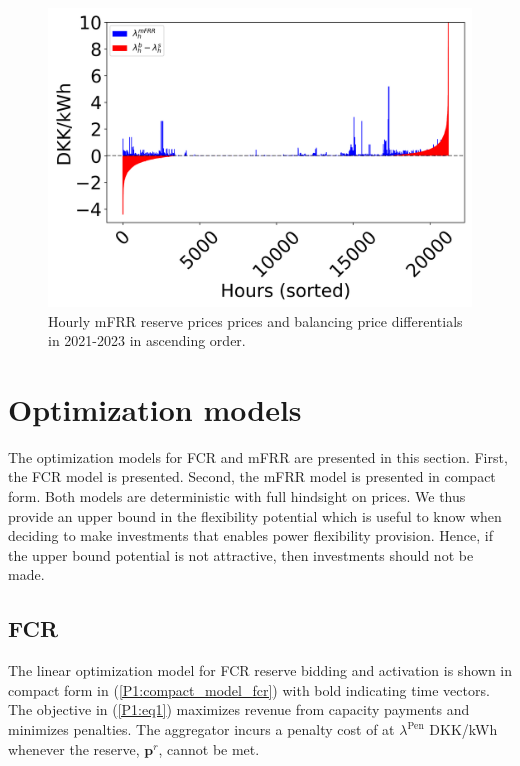 \documentclass[lettersize,journal]{IEEEtran}
\begin{document}
\begin{figure}[t]
    \centering
    \includegraphics[width=\columnwidth]{figures/mfrr_prices.png}
    \caption{Hourly mFRR reserve prices prices and balancing price differentials in 2021-2023 in ascending order.}
    \label{fig:mfrr_prices_2022}
\end{figure}

\section{Optimization models}

The optimization models for FCR and mFRR are presented in this section. First, the FCR model is presented. Second, the mFRR model is presented in compact form. Both models are deterministic with full hindsight on prices. We thus provide an upper bound in the flexibility potential which is useful to know when deciding to make investments that enables power flexibility provision. Hence, if the upper bound potential is not attractive, then investments should not be made.

\subsection{FCR}

The linear optimization model for FCR reserve bidding and activation is shown in compact form in (\ref{P1:compact_model_fcr}) with bold indicating time vectors. The objective in (\ref{P1:eq1}) maximizes revenue from capacity payments and minimizes penalties. The aggregator incurs a penalty cost of at $\lambda^{\text{Pen}}$ DKK/kWh whenever the reserve, $\bm{p}^{r}$, cannot be met.
\end{document}
